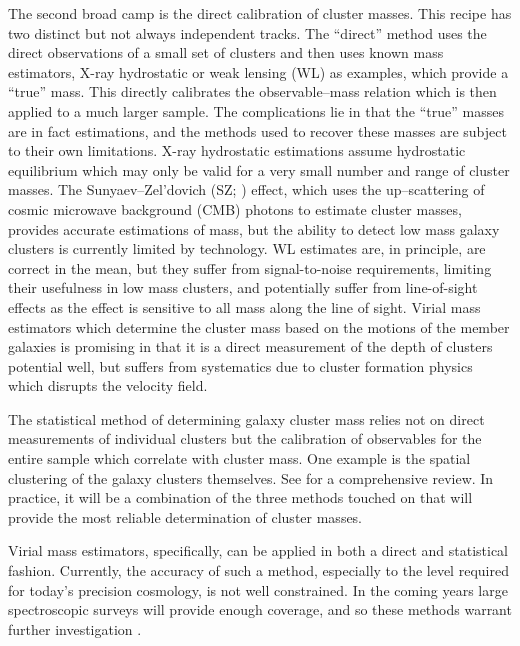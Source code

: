 \documentclass[12pt]{article}
\begin{document}
The second broad camp is the direct calibration of cluster masses. This recipe has two distinct but not always independent tracks. The ``direct'' method uses the direct observations of a small set of clusters and then uses known mass estimators, X-ray hydrostatic or weak lensing (WL) as examples, which provide a ``true'' mass. This directly calibrates the observable--mass relation which is then applied to a much larger sample. The complications lie in that the ``true'' masses are in fact estimations, and the methods used to recover these masses are subject to their own limitations. X-ray hydrostatic estimations assume hydrostatic equilibrium which may only be valid for a very small number and range of cluster masses. The Sunyaev--Zel’dovich (SZ; \citealt{Sunyaev1972}) effect, which uses the up--scattering of cosmic microwave background (CMB) photons to estimate cluster masses, provides accurate estimations of mass, but the ability to detect low mass galaxy clusters is currently limited by technology. WL estimates are, in principle, are correct in the mean, but they suffer from signal-to-noise requirements, limiting their usefulness in low mass clusters, and potentially suffer from line-of-sight effects as the effect is sensitive to all mass along the line of sight. Virial mass estimators which determine the cluster mass based on the motions of the member galaxies is promising in that it is a direct measurement of the depth of clusters potential well, but suffers from systematics due to cluster formation physics which disrupts the velocity field.
 
The statistical method of determining galaxy cluster mass relies not on direct measurements of individual clusters but the calibration of observables for the entire sample which correlate with cluster mass. One example is the spatial clustering of the galaxy clusters themselves. See \cite{Weinberg2013} for a comprehensive review. In practice, it will be a combination of the three methods touched on that will provide the most reliable determination of cluster masses. 

Virial mass estimators, specifically, can be applied in both a direct and statistical fashion. Currently, the accuracy of such a method, especially to the level required for today's precision cosmology, is not well constrained. In the coming years large spectroscopic surveys will provide enough coverage, and so these methods warrant further investigation .
\end{document}
